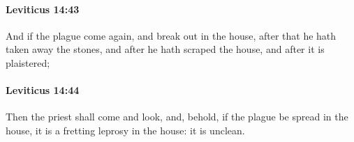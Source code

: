 		\paragraph{Leviticus 14:43} %
			\label{LEVITICUS-14-43}

			And if the plague come again, and break out in the house, after that he hath taken away the stones, and after he hath scraped the house, and after it is plaistered;


		\paragraph{Leviticus 14:44} %
			\label{LEVITICUS-14-44}

			Then the priest shall come and look, and, behold, if the plague be spread in the house, it is a fretting leprosy in the house: it is unclean.


